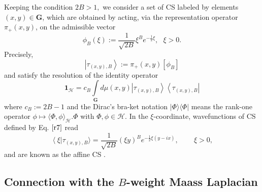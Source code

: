 \smallskip

Keeping the condition $2B>1,$ we consider a set of CS labeled by elements $%
(x,y)\in \mathbf{G}$, which are obtained by acting, via the representation
operator $\pi _{+}\left( x,y\right) $, on the admissible vector 
\begin{equation}
\label{r6}
\phi _{B}\left( \xi \right) :=\frac{1}{\sqrt{2B}}\xi ^{B}e^{-\frac{1}{2}\xi
},\text{ \ \ }\xi >0.  
\end{equation}
Precisely, 
\begin{equation}
\label{r7}
\left\vert \tau _{(x,y),B}\right\rangle :=\pi _{+}\left( x,y\right) \left[
\phi _{B}\right]  
\end{equation}
and satisfy the resolution of the identity operator 
\begin{equation}
\label{r8}
\mathbf{1}_{\mathcal{H}}=c_{B}\int\limits_{\mathbf{G}}d\mu \left( x,y\right)
\left\vert \tau _{(x,y),B}\right\rangle \left\langle \tau
_{(x,y),B}\right\vert 
\end{equation}%
where $c_{B}:=2B-1$ and the Dirac's bra-ket notation $|\Phi \rangle \langle
\Phi |$ means the rank-one operator $\phi \longmapsto \langle \Phi ,\phi
\rangle _{\mathcal{H}}.\Phi $ with $\Phi ,\phi \in \mathcal{H}$. In the $\xi 
$-coordinate, wavefunctions of CS defined by Eq. $\eqref{r7} $ read 
\begin{equation}
\label{r9}
\left\langle \xi \right\vert \tau _{(x,y),B}\rangle =\frac{1}{\sqrt{2B}}%
\left( \xi y\right) ^{B}e^{-\frac{1}{2}\xi \left( y-ix\right) }\text{, }%
\qquad \xi >0,  
\end{equation}
and are known as the affine CS \cite{AK}.




\subsection{Connection with the $B$-weight Maass Laplacian}

